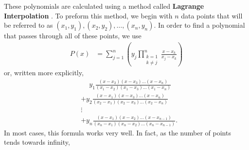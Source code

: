 \documentclass[12pt]{article}
\newenvironment{Figure}
  {\par\medskip\noindent\minipage{\linewidth}}
  {\endminipage\par\medskip}
\begin{document}
\begin{multicols*}{2}
\begin{Figure}
    \end{Figure}

    These polynomials are calculated using a method called \textbf{Lagrange Interpolation} \cite{enwiki:lagrange_polynomial}\cite{mathworld:lagrange_polynomial}. To preform this method, we begin with $n$ data points that will be referred to as $(x_1, y_1), (x_2, y_2), \ldots, (x_n, y_n)$. In order to find a polynomial that passes through all of these points, we use
    \begin{align*}
        P(x) & = \sum_{j=1}^n\left(y_j\prod_{\substack{k=1 \\ k\neq j}}^n
        \frac{x-x_k}{x_j-x_k} \right)
    \end{align*}
    or, written more explicitly,
    \begin{align*}
         & \phantom{+} y_1\frac{(x-x_2)(x-x_3)\ldots(x-x_n)}{(x_1-x_2)(x_1-x_3)\ldots(x_1-x_n)} \\
         & + y_2\frac{(x-x_1)(x-x_3)\ldots(x-x_n)}{(x_2-x_1)(x_2-x_3)\ldots(x_2-x_n)}           \\
         & \vdots                                                                               \\
         & + y_n\frac{(x-x_1)(x-x_2)\ldots(x-x_{n-1})}{(x_n-x_1)(x_n-x_2)\ldots(x_n-x_{n-1})}.
    \end{align*}
    In most cases, this formula works very well. In fact, as the number of points tends towards infinity, 


    
    
\end{multicols*}
\end{document}
